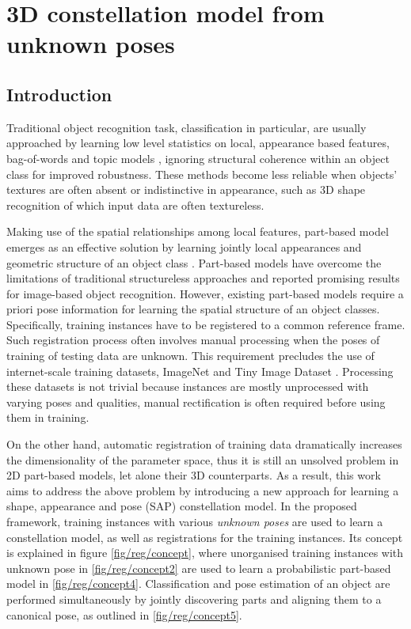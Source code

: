 \chapter{3D constellation model from unknown poses}
\label{chap/reg}

\section{Introduction}
\label{sec/reg/intro}

Traditional object recognition task, classification in particular, are usually approached by learning low level statistics on local, appearance based features, \eg bag-of-words \cite{Sivic2005, Fei-Fei2005} and topic models \cite{Fergus2005}, ignoring structural coherence within an object class for improved robustness. These methods become less reliable when objects' textures are often absent or indistinctive in appearance, such as 3D shape recognition of which input data are often textureless. 

Making use of the spatial relationships among local features, part-based model emerges as an effective solution by learning jointly local appearances and geometric structure of an object class \cite{Weber2000, Felzenszwalb2005, Fergus2007}. 
Part-based models have overcome the limitations of traditional structureless approaches and reported promising results for image-based object recognition. However, existing part-based models require a priori pose information for learning the spatial structure of an object classes. Specifically, training instances have to be registered to a common reference frame. Such registration process often involves manual processing when the poses of training of testing data are unknown. This requirement precludes the use of internet-scale training datasets, \eg ImageNet \cite{Deng2009} and Tiny Image Dataset \cite{Torralba2008}. Processing these datasets is not trivial because instances are mostly unprocessed with varying poses and qualities, manual rectification is often required before using them in training. 

On the other hand, automatic registration of training data dramatically increases the dimensionality of the parameter space, thus it is still an unsolved problem in 2D part-based models, let alone their 3D counterparts. 
As a result, this work aims to address the above problem by introducing a new approach for learning a shape, appearance and pose (SAP) constellation model. 
In the proposed framework, training instances with various \emph{unknown poses} are used to learn a constellation model, as well as registrations for the training instances. Its concept is explained in figure \ref{fig/reg/concept}, where unorganised training instances with unknown pose in \ref{fig/reg/concept2} are used to learn a probabilistic part-based model in \ref{fig/reg/concept4}. Classification and pose estimation of an object are performed simultaneously by jointly discovering parts and aligning them to a canonical pose, as outlined in \ref{fig/reg/concept5}. 

